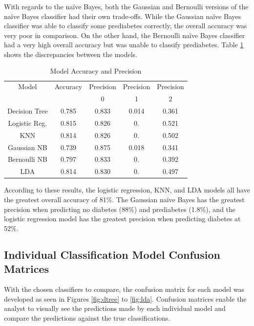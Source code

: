 \documentclass[journal]{IEEEtran}
\begin{document}
With regards to the naïve Bayes, both the Gaussian and Bernoulli versions of the naïve Bayes classifier had their own trade-offs. While the Gaussian naïve Bayes classifier was able to classify some prediabetes correctly, the overall accuracy was very poor in comparison. On the other hand, the Bernoulli naïve Bayes classifier had a very high overall accuracy but was unable to classify prediabetes. Table \ref{table:accuracy} shows the discrepancies between the models. 


\begin{table}[h!]
\centering
\begin{tabular}{c | c c c c}
Model & Accuracy & Precision & Precision & Precision\\
    & & 0 & 1 & 2 \\
\hline
Decision Tree	& 0.785 & 0.833 & 0.014 & 0.361 \\
Logistic Reg.	& 0.815 & 0.826 & 0. & 0.521 \\
KNN	& 0.814 & 0.826 & 0. & 0.502 \\
Gaussian NB	& 0.739 & 0.875 & 0.018 & 0.341 \\
Bernoulli NB	& 0.797 & 0.833 & 0. & 0.392 \\
LDA	& 0.814 & 0.830 & 0. & 0.497 \\
\end{tabular}
\caption{Model Accuracy and Precision}
\label{table:accuracy}
\end{table}

According to these results, the logistic regression, KNN, and LDA models all have the greatest overall accuracy of 81\%. The Gaussian naïve Bayes has the greatest precision when predicting no diabetes (88\%) and prediabetes (1.8\%), and the logistic regression model has the greatest precision when predicting diabetes at 52\%.

\subsection{Individual Classification Model Confusion Matrices}

With the chosen classifiers to compare, the confusion matrix for each model was developed as seen in Figures \ref{fig:dtree} to \ref{fig:lda}. Confusion matrices enable the analyst to visually see the predictions made by each individual model and compare the predictions against the true classifications.

\pagebreak
\end{document}

